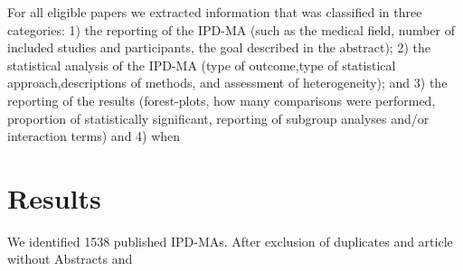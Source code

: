 \documentclass[]{article}
\begin{document}
For all eligible papers we extracted information that was classified in
three categories: 1) the reporting of the IPD-MA (such as the medical
field, number of included studies and participants, the goal described
in the abstract); 2) the statistical analysis of the IPD-MA (type of
outcome,type of statistical approach,descriptions of methods, and
assessment of heterogeneity); and 3) the reporting of the results
(forest-plots, how many comparisons were performed, proportion of
statistically significant, reporting of subgroup analyses and/or
interaction terms) and 4) when

\newpage

\hypertarget{results-1}{%
\section{Results}\label{results-1}}

We identified 1538 published IPD-MAs. After exclusion of duplicates and
article without Abstracts and
\end{document}
